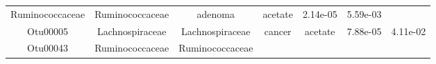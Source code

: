 \documentclass[11pt,]{article}
\begin{document}
\begin{longtable}[]{@{}ccccccc@{}}
\begin{minipage}[t]{0.17\columnwidth}
Ruminococcaceae\strut
\end{minipage} & \begin{minipage}[t]{0.17\columnwidth}\centering\strut
Ruminococcaceae\strut
\end{minipage} & \begin{minipage}[t]{0.09\columnwidth}\centering\strut
adenoma\strut
\end{minipage} & \begin{minipage}[t]{0.11\columnwidth}\centering\strut
acetate\strut
\end{minipage} & \begin{minipage}[t]{0.09\columnwidth}\centering\strut
2.14e-05\strut
\end{minipage} & \begin{minipage}[t]{0.09\columnwidth}\centering\strut
5.59e-03\strut
\end{minipage}\tabularnewline
\begin{minipage}[t]{0.09\columnwidth}\centering\strut
Otu00005\strut
\end{minipage} & \begin{minipage}[t]{0.17\columnwidth}\centering\strut
Lachnospiraceae\strut
\end{minipage} & \begin{minipage}[t]{0.17\columnwidth}\centering\strut
Lachnospiraceae\strut
\end{minipage} & \begin{minipage}[t]{0.09\columnwidth}\centering\strut
cancer\strut
\end{minipage} & \begin{minipage}[t]{0.11\columnwidth}\centering\strut
acetate\strut
\end{minipage} & \begin{minipage}[t]{0.09\columnwidth}\centering\strut
7.88e-05\strut
\end{minipage} & \begin{minipage}[t]{0.09\columnwidth}\centering\strut
4.11e-02\strut
\end{minipage}\tabularnewline
\begin{minipage}[t]{0.09\columnwidth}\centering\strut
Otu00043\strut
\end{minipage} & \begin{minipage}[t]{0.17\columnwidth}\centering\strut
Ruminococcaceae\strut
\end{minipage} & \begin{minipage}[t]{0.17\columnwidth}\centering\strut
Ruminococcaceae\strut
\end{minipage} & \begin{minipage}[t]{0.09\columnwidth}\centering\strut

\end{minipage}
\end{longtable}
\end{document}
